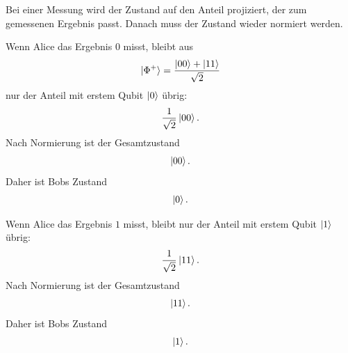 \documentclass[11pt,a4paper]{scrartcl}
\begin{document}
\begin{enumerate}[label=(\alph*)]
        \begin{calculationbox}
            Bei einer Messung wird der Zustand auf den Anteil projiziert, der zum gemessenen Ergebnis passt. Danach muss der Zustand wieder normiert werden.

            \begin{calculationbox}[title=Alice misst $0$]
                Wenn Alice das Ergebnis $0$ misst, bleibt aus
                \begin{align*}
                    \ket{\Phi^+}
                    =
                    \frac{\ket{00}+\ket{11}}{\sqrt2}
                \end{align*}
                nur der Anteil mit erstem Qubit $\ket{0}$ übrig:
                \begin{align*}
                    \frac1{\sqrt2}\ket{00}.
                \end{align*}
                Nach Normierung ist der Gesamtzustand
                \begin{align*}
                    \ket{00}.
                \end{align*}
                Daher ist Bobs Zustand
                \begin{align*}
                    \ket{0}.
                \end{align*}
            \end{calculationbox}

            \begin{calculationbox}[title=Alice misst $1$]
                Wenn Alice das Ergebnis $1$ misst, bleibt nur der Anteil mit erstem Qubit $\ket{1}$ übrig:
                \begin{align*}
                    \frac1{\sqrt2}\ket{11}.
                \end{align*}
                Nach Normierung ist der Gesamtzustand
                \begin{align*}
                    \ket{11}.
                \end{align*}
                Daher ist Bobs Zustand
                \begin{align*}
                    \ket{1}.
                \end{align*}
            \end{calculationbox}


\end{calculationbox}
\end{enumerate}
\end{document}
